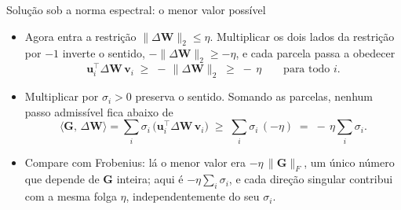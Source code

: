 \documentclass[aspectratio=169,xcolor=dvipsnames]{beamer}
\begin{document}
  \begin{frame}{Solução sob a norma espectral: o menor valor possível}
    \begin{itemize}
      \item Agora entra a restrição $\|\Delta \mathbf{W}\|_{2}\le\eta$. Multiplicar os dois lados da restrição
        por $-1$ inverte o sentido, $-\|\Delta \mathbf{W}\|_{2}\ge-\eta$, e cada parcela passa a obedecer
        \[
          \mathbf{u}_{i}^{\top}\Delta \mathbf{W}\,\mathbf{v}_{i}\;\ge\;-\,\|\Delta \mathbf{W}\|_{2}\;\ge\;-\,\eta
          \qquad\text{para todo } i.
        \]
      \item Multiplicar por $\sigma_{i}>0$ preserva o sentido. Somando as parcelas, nenhum passo
        admissível fica abaixo de
        \[
          \langle \mathbf{G},\,\Delta \mathbf{W}\rangle
          =\sum_{i}\sigma_{i}\,\big(\mathbf{u}_{i}^{\top}\Delta \mathbf{W}\,\mathbf{v}_{i}\big)
          \;\ge\;\sum_{i}\sigma_{i}\,(-\eta)
          \;=\;-\,\eta\sum_{i}\sigma_{i}.
        \]
      \item Compare com Frobenius: lá o menor valor era $-\eta\,\|\mathbf{G}\|_{F}$, um único número que
        depende de $\mathbf{G}$ inteira; aqui é $-\eta\sum_{i}\sigma_{i}$, e cada direção singular
        contribui com a mesma folga $\eta$, independentemente do seu $\sigma_{i}$.
    \end{itemize}
  \end{frame}
\end{document}
